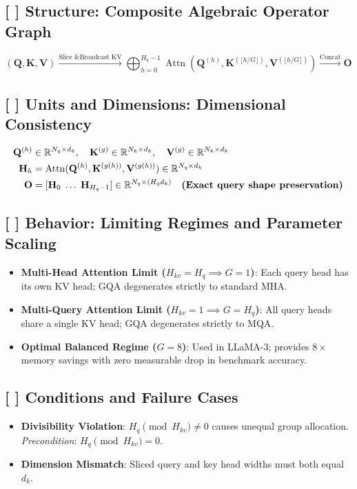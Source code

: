 \documentclass[11pt,a4paper]{article}
\theoremstyle{definition}
\begin{document}
\subsection{[ ] Structure: Composite Algebraic Operator Graph}
{\boldmath
\begin{equation}
(\mathbf{Q}, \mathbf{K}, \mathbf{V}) \xrightarrow{\text{Slice \& Broadcast KV}} \bigoplus_{h=0}^{H_q-1} \operatorname{Attn}\left(\mathbf{Q}^{(h)}, \mathbf{K}^{(\lfloor h/G \rfloor)}, \mathbf{V}^{(\lfloor h/G \rfloor)}\right) \xrightarrow{\text{Concat}} \mathbf{O}
\end{equation}
}

\subsection{[ ] Units and Dimensions: Dimensional Consistency}
{\boldmath
\begin{align}
\mathbf{Q}^{(h)} &\in \mathbb{R}^{N_q \times d_k}, \quad \mathbf{K}^{(g)} \in \mathbb{R}^{N_k \times d_k}, \quad \mathbf{V}^{(g)} \in \mathbb{R}^{N_k \times d_k} \\
\mathbf{H}_h &= \operatorname{Attn}(\mathbf{Q}^{(h)}, \mathbf{K}^{(g(h))}, \mathbf{V}^{(g(h))}) \in \mathbb{R}^{N_q \times d_k} \\
\mathbf{O} &= [\mathbf{H}_0 \; \dots \; \mathbf{H}_{H_q - 1}] \in \mathbb{R}^{N_q \times (H_q d_k)} \quad \text{\textbf{(Exact query shape preservation)}}
\end{align}
}

\subsection{[ ] Behavior: Limiting Regimes and Parameter Scaling}
\begin{itemize}
    \item \textbf{Multi-Head Attention Limit ($H_{kv} = H_q \implies G = 1$)}: Each query head has its own KV head; GQA degenerates strictly to standard MHA.
    \item \textbf{Multi-Query Attention Limit ($H_{kv} = 1 \implies G = H_q$)}: All query heads share a single KV head; GQA degenerates strictly to MQA.
    \item \textbf{Optimal Balanced Regime ($G = 8$)}: Used in LLaMA-3; provides $8\times$ memory savings with zero measurable drop in benchmark accuracy.
\end{itemize}

\subsection{[ ] Conditions and Failure Cases}
\begin{itemize}
    \item \textbf{Divisibility Violation}: $H_q \pmod{H_{kv}} \ne 0$ causes unequal group allocation. \emph{Precondition}: $H_q \pmod{H_{kv}} = 0$.
    \item \textbf{Dimension Mismatch}: Sliced query and key head widths must both equal $d_k$.
\end{itemize}
\end{document}

